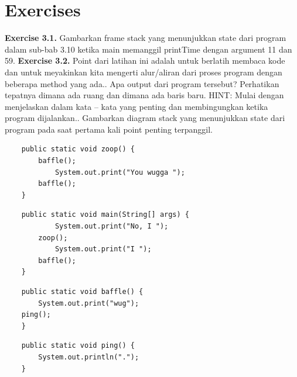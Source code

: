 \section{Exercises}
\textbf{Exercise 3.1.} Gambarkan frame stack yang menunjukkan state dari program dalam sub-bab 3.10 ketika main memanggil printTime dengan argument 11 dan 59.\newline \newline
\textbf{Exercise 3.2.} Point dari latihan ini adalah untuk berlatih membaca kode dan untuk meyakinkan kita mengerti alur/aliran dari proses program dengan beberapa method yang ada.\newline {}.	Apa output dari program tersebut? Perhatikan tepatnya dimana ada ruang dan dimana ada baris baru.
HINT: Mulai dengan menjelaskan dalam kata – kata yang penting dan membingungkan ketika program dijalankan.\newline {}.	Gambarkan diagram stack yang menunjukkan state dari program pada saat pertama kali point penting terpanggil.\newline \newline
\begin{lstlisting}
	public static void zoop() {
		baffle();
			System.out.print("You wugga ");
		baffle();
	}
\end{lstlisting}
\begin{lstlisting}
	public static void main(String[] args) {
			System.out.print("No, I ");
		zoop();
			System.out.print("I ");
		baffle();
	}
\end{lstlisting}
\begin{lstlisting}
	public static void baffle() {
		System.out.print("wug");
	ping();
	}
\end{lstlisting}
\begin{lstlisting}
	public static void ping() {
		System.out.println(".");
	}
\end{lstlisting}

